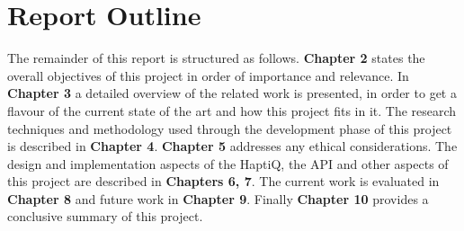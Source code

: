 \section{Report Outline}
The remainder of this report is structured as follows. \textbf{Chapter 2} states the overall objectives of this project in order of importance and relevance. In \textbf{Chapter 3} a detailed overview of the related work is presented, in order to get a flavour of the current state of the art and how this project fits in it. The research techniques and methodology used through the development phase of this project is described in \textbf{Chapter 4}. \textbf{Chapter 5} addresses any ethical considerations. The design and implementation aspects of the HaptiQ, the API and other aspects of this project are described in \textbf{Chapters 6, 7}. The current work is evaluated in \textbf{Chapter 8}  and future work in \textbf{Chapter 9}. Finally \textbf{Chapter 10} provides a conclusive summary of this project.